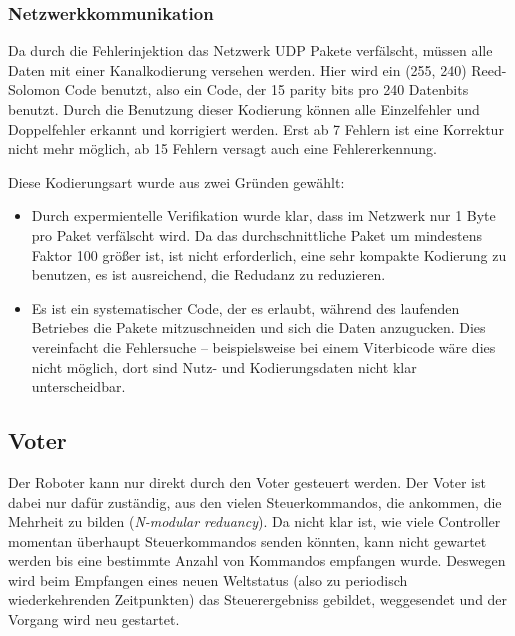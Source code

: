 {\subsubsection{Netzwerkkommunikation}
Da durch die Fehlerinjektion das Netzwerk UDP Pakete verf{\"{a}}lscht, m{\"{u}}ssen alle Daten mit einer 
Kanalkodierung versehen werden. Hier wird ein (255, 240) Reed-Solomon Code benutzt, also ein Code, der 15 parity 
bits pro 240 Datenbits benutzt. Durch die Benutzung dieser Kodierung k{\"{o}}nnen alle Einzelfehler und 
Doppelfehler erkannt und korrigiert werden. Erst ab 7 Fehlern ist eine Korrektur nicht mehr m{\"{o}}glich, ab 15 
Fehlern versagt auch eine Fehlererkennung.

Diese Kodierungsart wurde aus zwei Gr{\"{u}}nden gew{\"{a}}hlt:
\begin{itemize}
\item Durch expermientelle Verifikation wurde klar, dass im Netzwerk nur 1 Byte pro Paket verf{\"{a}}lscht wird.
	Da das durchschnittliche Paket um mindestens Faktor 100 gr{\"{o}}{\ss}er ist, ist nicht erforderlich,
	eine sehr kompakte Kodierung zu benutzen, es ist ausreichend, die Redudanz zu reduzieren. 
\item Es ist ein systematischer Code, der es erlaubt, w{\"{a}}hrend des laufenden Betriebes die Pakete 
	mitzuschneiden und sich die Daten anzugucken. Dies vereinfacht die Fehlersuche -- beispielsweise bei
	einem Viterbicode w{\"{a}}re dies nicht m{\"{o}}glich, dort sind Nutz- und Kodierungsdaten nicht klar 
	unterscheidbar.
\end{itemize}

\subsection{Voter}
\label{voter}
Der Roboter kann nur direkt durch den Voter gesteuert werden. Der Voter ist dabei nur daf{\"{u}}r
zust{\"{a}}ndig, aus den vielen Steuerkommandos, die ankommen, die Mehrheit zu bilden (\textit{N-modular reduancy}).
Da nicht klar ist, wie viele Controller momentan {\"{u}}berhaupt Steuerkommandos senden k{\"{o}}nnten,
kann nicht gewartet werden bis eine bestimmte Anzahl von Kommandos empfangen wurde. Deswegen wird beim Empfangen
eines neuen Weltstatus (also zu periodisch wiederkehrenden Zeitpunkten) das Steuerergebniss gebildet,
weggesendet und der Vorgang wird neu gestartet.

}
